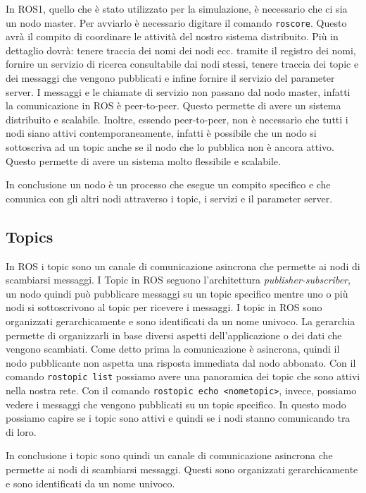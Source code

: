In ROS1, quello che è stato utilizzato per la simulazione, è necessario che ci sia un nodo master. Per avviarlo è necessario digitare il comando \verb+roscore+. Questo avrà il compito di coordinare le attività del nostro sistema distribuito. Più in dettaglio dovrà: tenere traccia dei nomi dei nodi ecc. tramite il registro dei nomi, fornire un servizio di ricerca consultabile dai nodi stessi, tenere traccia dei topic e dei messaggi che vengono pubblicati e infine fornire il servizio del parameter server.
I messaggi e le chiamate di servizio non passano dal nodo master, infatti la comunicazione in ROS è peer-to-peer. Questo permette di avere un sistema distribuito e scalabile. Inoltre, essendo peer-to-peer, non è necessario che tutti i nodi siano attivi contemporaneamente, infatti è possibile che un nodo si sottoscriva ad un topic anche se il nodo che lo pubblica non è ancora attivo. Questo permette di avere un sistema molto flessibile e scalabile.

In conclusione un nodo è un processo che esegue un compito specifico e che comunica con gli altri nodi attraverso i topic, i servizi e il parameter server.
\subsection{Topics}
\label{subsec:topics}
In ROS i topic sono un canale di comunicazione asincrona che permette ai nodi di scambiarsi messaggi. I Topic in ROS seguono l'architettura \textit{publisher-subscriber}, un nodo quindi può pubblicare messaggi su un topic specifico mentre uno o più nodi si sottoscrivono al topic per ricevere i messaggi.
I topic in ROS sono organizzati gerarchicamente e sono identificati da un nome univoco. La gerarchia permette di organizzarli in base diversi aspetti dell'applicazione o dei dati che vengono scambiati. 
Come detto prima la comunicazione è asincrona, quindi il nodo pubblicante non aspetta una risposta immediata dal nodo abbonato.
Con il comando \verb+rostopic list+ possiamo avere una panoramica dei topic che sono attivi nella nostra rete. Con il comando \verb+rostopic echo <nometopic>+, invece, possiamo vedere i messaggi che vengono pubblicati su un topic specifico. In questo modo possiamo capire se i topic sono attivi e quindi se i nodi stanno comunicando tra di loro.

In conclusione i topic sono quindi un canale di comunicazione asincrona che permette ai nodi di scambiarsi messaggi. Questi sono organizzati gerarchicamente e sono identificati da un nome univoco.
